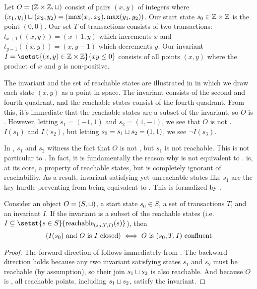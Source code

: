 {}

\begin{example}
  Let $O = (\mathbb{Z} \times \mathbb{Z}, \sqcup)$ consist of pairs $(x, y)$ of integers
  where $(x_1, y_1) \sqcup (x_2, y_2) = (\max(x_1, x_2), \max(y_1, y_2))$. Our
  start state $s_0 \in \mathbb{Z} \times \mathbb{Z}$ is the point $(0, 0)$. Our set $T$
  of transactions consists of two transactions: $t_{x+1}((x, y)) = (x + 1, y)$
  which increments $x$ and $t_{y-1}((x, y)) = (x, y - 1)$ which decrements $y$.
  Our invariant $I = \setst{(x, y) \in \ints \times \ints}{xy \leq 0}$ consists
  of all points $(x, y)$ where the product of $x$ and $y$ is non-positive.

  The invariant and the set of reachable states are illustrated in 
  in which we draw each state $(x, y)$ as a point in space. The invariant
  consists of the second and fourth quadrant, and the reachable states consist
  of the fourth quadrant. From this, it's immediate that the reachable states
  are a subset of the invariant, so $O$ is \invariantconfluent{}. However,
  letting $s_1 = (-1, 1)$ and $s_2 = (1, -1)$, we see that $O$ is not
  \invariantclosed{}. $I(s_1)$ and $I(s_2)$, but letting $s_3 = s_1 \sqcup s_2 =
  (1, 1)$, we see $\lnot I(s_3)$.
\end{example}

In , $s_1$ and $s_2$ witness the fact that $O$ is not
\invariantclosed{}, but $s_1$ is not reachable. This is not particular to
. In fact, it is fundamentally the reason why
\invariantclosure{} is not equivalent to \invariantconfluence{}.
\Invariantconfluence{} is, at its core, a property of reachable states, but
\invariantclosure{} is completely ignorant of reachability. As a result,
invariant satisfying yet unreachable states like $s_1$ are the key hurdle
preventing \invariantclosure{} from being equivalent to \invariantconfluence{}.
This is formalized by .

\begin{theorem}
  Consider an object $O = (S, \sqcup)$, a start state $s_0 \in S$, a set of
  transactions $T$, and an invariant $I$. If the invariant is a subset of the
  reachable states (i.e. $I \subseteq \setst{s \in
  S}{\sTIreachablepredicate{s}}$), then
  \[
    (\text{$I(s_0)$ and $O$ is $I$ closed{}}) \iff \text{$O$ is $(s_0, T, I)$ confluent{}}
  \]
\end{theorem}
\begin{proof}
  The forward direction of  follows
  immediately from . The backward direction
  holds because any two invariant satisfying states $s_1$ and $s_2$ must be
  reachable (by assumption), so their join $s_1 \sqcup s_2$ is also reachable.
  And because $O$ is \sTIconfluent{}, all reachable points, including $s_1
  \sqcup s_2$, satisfy the invariant.
\end{proof}
